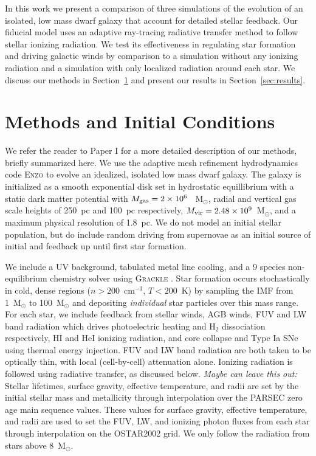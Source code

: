 \documentclass[twocolumn]{aastex62}
\begin{document}
In this work we present a comparison of three simulations of the evolution of an isolated, low mass dwarf galaxy that account for detailed stellar feedback. Our fiducial model uses an adaptive ray-tracing radiative transfer method to follow stellar ionizing radiation. We test its effectiveness in regulating star formation and driving galactic winds by comparison to a simulation without any ionizing radiation and a simulation with only localized radiation around each star. We discuss our methods in Section~\ref{sec:methods} and present our results in Section~\ref{sec:results}.

\section{Methods and Initial Conditions} \label{sec:methods}
We refer the reader to Paper I for a more detailed description of our methods, briefly summarized here. We use the adaptive mesh refinement hydrodynamics code \textsc{Enzo} \citep{Enzo2014} to evolve an idealized, isolated low mass dwarf galaxy. The galaxy is initialized as a smooth exponential disk set in hydrostatic equillibrium with a static dark matter potential \citep{Burkert1995} with $M_{\rm gas} = 2 \times 10^6~$~M$_{\odot}$, radial and vertical gas scale heights of 250~pc and 100~pc respectively, $M_{\rm vir} = 2.48 \times 10^9$~M$_{\odot}$, and a maximum physical resolution of 1.8~pc. We do not model an initial stellar population, but do include random driving from supernovae as an initial source of initial and feedback up until first star formation.

We include a UV background, tabulated metal line cooling, and a 9 species non-equilibrium chemistry solver using \textsc{Grackle} \citep{GrackleMethod}. Star formation occurs stochastically in cold, dense regions ($n > 200$~cm$^{-3}$, $T < 200$~K) by sampling the \cite{Salpeter1955} IMF from 1~M$_{\odot}$ to 100~M$_{\odot}$ and depositing \textit{individual} star particles over this mass range. For each star, we include feedback from stellar winds, AGB winds, FUV and LW band radiation which drives photoelectric heating and H$_2$ dissociation respectively, HI and HeI ionizing radiation, and core collapse and Type Ia SNe using thermal energy injection. FUV and LW band radiation are both taken to be optically thin, with local (cell-by-cell) attenuation alone. Ionizing radiation is followed using radiative transfer, as discussed below. \textit{Maybe can leave this out:} Stellar lifetimes, surface gravity, effective temperature, and radii are set by the initial stellar mass and metallicity through interpolation over the PARSEC \citep{Bressan2012} zero age main sequence values. These values for surface gravity, effective temperature, and radii are used to set the FUV, LW, and ionizing photon fluxes from each star through interpolation on the OSTAR2002 \citep{LanHubeny2003} grid. We only follow the radiation from stars above 8~M$_{\odot}$. 
\end{document}
